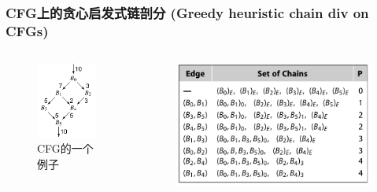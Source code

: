 \begin{frame}
    \frametitle{CFG上的贪心启发式链剖分 (Greedy heuristic chain div on CFGs)}

    \begin{columns}
        \begin{column}{0.3\textwidth}
            \begin{figure}
                \centering
                \includegraphics[width=1.0\textwidth]{images/example_cfg.png}
                \caption{CFG的一个例子\cite{cooper2011engineering}}
            \end{figure}
        \end{column}
        \begin{column}{0.6\textwidth}
            \begin{figure}
                \centering
                \includegraphics[width=1.0\textwidth]{images/greedy.png}

\end{figure}
\end{column}
\end{columns}
\end{frame}
